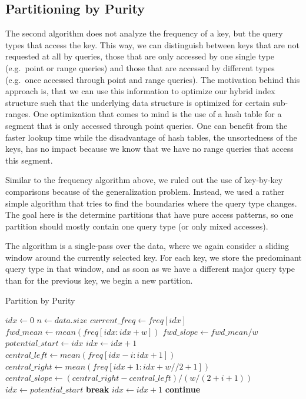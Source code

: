 \subsection{Partitioning by Purity} \label{sec:purity}
The second algorithm does not analyze the frequency of a key, but the query types that access the key. This way, we can distinguish between keys that are not requested at all by queries, those that are only accessed by one single type (e.g.~point or range queries) and those that are accessed by different types (e.g.~once accessed through point and range queries). The motivation behind this approach is, that we can use this information to optimize our hybrid index structure such that the underlying data structure is optimized for certain sub-ranges. One optimization that comes to mind is the use of a hash table for a segment that is only accessed through point queries. One can benefit from the faster lookup time while the disadvantage of hash tables, the unsortedness of the keys, has no impact because we know that we have no range queries that access this segment.

Similar to the frequency algorithm above, we ruled out the use of key-by-key comparisons because of the generalization problem. Instead, we used a rather simple algorithm that tries to find the boundaries where the query type changes. The goal here is the determine partitions that have pure access patterns, so one partition should mostly contain one query type (or only mixed accesses). 

The algorithm is a single-pass over the data, where we again consider a sliding window around the currently selected key. For each key, we store the predominant query type in that window, and as soon as we have a different major query type than for the previous key, we begin a new partition.

\begin{algorithm}
\caption{Partition by Purity}
\begin{algorithmic} 
    \STATE $idx \leftarrow 0$
    \STATE $n \leftarrow data.size$
    \STATE $current\_freq \leftarrow freq[idx]$
    \STATE $fwd\_mean \leftarrow mean(freq[idx : idx + w])$
    \STATE $fwd\_slope \leftarrow fwd\_mean / w$
    \STATE $potential\_start \leftarrow idx$
    \STATE $idx \leftarrow idx + 1$
    \STATE $central\_left \leftarrow mean(freq[idx - i : idx + 1])$
    \STATE $central\_right \leftarrow mean(freq[idx + 1 : idx + w // 2 + 1])$
    \STATE $central\_slope \leftarrow (central\_right - central\_left) / (w / (2 + i + 1))$
    \STATE $idx \leftarrow potential\_start$
    \STATE\textbf{break}
    \ENDIF
    \ENDFOR
    \STATE $idx \leftarrow idx + 1$
    \STATE \textbf{continue}
    \ENDIF
    \ENDIF
    \ENDWHILE
    
\end{algorithmic}
\end{algorithm}


